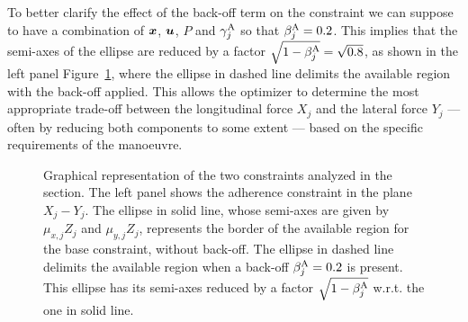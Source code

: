 To better clarify the effect of the back-off term on the constraint we can suppose to have a combination of $\boldsymbol{x}$, $\boldsymbol{u}$, $P$ and $\gamma^\textrm{A}_j$ so that $\beta^\textrm{A}_j=0.2$. This implies that the semi-axes of the ellipse are reduced by a factor $\sqrt{1-\beta^\textrm{A}_j} = \sqrt{0.8}$, as shown in the left panel Figure~\ref{fig:robust_constraints}, where the ellipse in dashed line delimits the available region with the back-off applied. This allows the optimizer to determine the most appropriate trade-off between the longitudinal force $X_j$ and the lateral force $Y_j$ --- often by reducing both components to some extent --- based on the specific requirements of the manoeuvre.


\begin{figure}
	\centering
	
	\hfill
	
	\caption{Graphical representation of the two constraints analyzed in the section. The left panel shows the adherence constraint in the plane $X_j-Y_j$. The ellipse in solid line, whose semi-axes are given by $\mu_{x,j}Z_j$ and $\mu_{y,j}Z_j$, represents the border of the available region for the base constraint, without back-off. The ellipse in dashed line delimits the available region when a back-off $\beta^\textrm{A}_j=0.2$ is present. This ellipse has its semi-axes reduced by a factor $\sqrt{1-\beta^\textrm{A}_j}$ w.r.t. the one in solid line. 
	}
	\label{fig:robust_constraints}
\end{figure}

